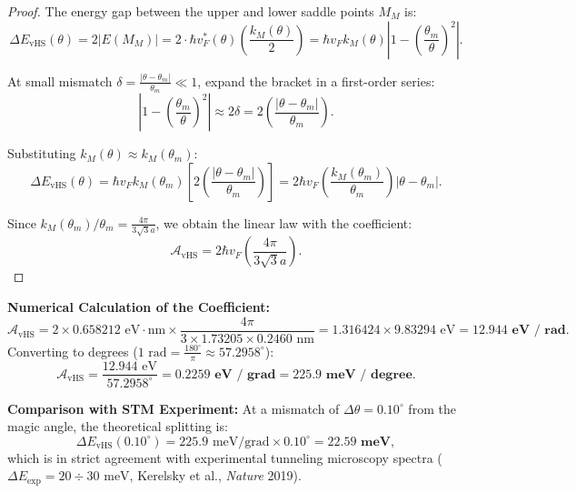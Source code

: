\documentclass[12pt,a4paper]{article}
\begin{document}
	\begin{proof}
	The energy gap between the upper and lower saddle points $M_M$ is:
	\begin{equation}
	\Delta E_{\text{vHS}}(\theta) = 2 |E(M_M)| = 2 \cdot \hbar v_F^*(\theta) \left( \frac{k_M(\theta)}{2} \right) = \hbar v_F k_M(\theta) \left| 1 - \left(\frac{\theta_m}{\theta}\right)^2 \right|.
	\end{equation}
				
	At small mismatch $\delta = \frac{|\theta - \theta_m|}{\theta_m} \ll 1$, expand the bracket in a first-order series:
\begin{equation}
\left| 1 - \left(\frac{\theta_m}{\theta}\right)^2 \right| \approx 2 \delta = 2 \left( \frac{|\theta - \theta_m|}{\theta_m} \right).
\end{equation}
				
Substituting $k_M(\theta) \approx k_M(\theta_m)$:
\begin{equation}
\Delta E_{\text{vHS}}(\theta) = \hbar v_F k_M(\theta_m) \left[ 2 \left( \frac{|\theta - \theta_m|}{\theta_m} \right) \right] = 2 \hbar v_F \left( \frac{k_M(\theta_m)}{\theta_m} \right) |\theta - \theta_m|.
\end{equation}
				
				Since $k_M(\theta_m) / \theta_m = \frac{4\pi}{3\sqrt{3} a}$, we obtain the linear law with the coefficient:
				\begin{equation}
					\mathcal{A}_{\text{vHS}} = 2 \hbar v_F \left( \frac{4\pi}{3\sqrt{3} a} \right).
				\end{equation}
			\end{proof}
			
			\textbf{Numerical Calculation of the Coefficient:}
			\begin{equation}
				\mathcal{A}_{\text{vHS}} = 2 \times 0.658212\text{ eV}\cdot\text{nm} \times \frac{4\pi}{3 \times 1.73205 \times 0.2460\text{ nm}} = 1.316424 \times 9.83294\text{ eV} = \mathbf{12.944\text{ eV / rad}}.
			\end{equation}
			Converting to degrees ($1\text{ rad} = \frac{180^\circ}{\pi} \approx 57.2958^\circ$):
			\begin{equation}
				\mathcal{A}_{\text{vHS}} = \frac{12.944\text{ eV}}{57.2958^\circ} = \mathbf{0.2259\text{ eV / grad}} = \mathbf{225.9\text{ meV / degree}}.
			\end{equation}
			
			\textbf{Comparison with STM Experiment:}
			At a mismatch of $\Delta \theta = 0.10^\circ$ from the magic angle, the theoretical splitting is:
			\begin{equation}
				\Delta E_{\text{vHS}}(0.10^\circ) = 225.9\text{ meV/grad} \times 0.10^\circ = \mathbf{22.59\text{ meV}},
			\end{equation}
			which is in strict agreement with experimental tunneling microscopy spectra ($\Delta E_{\text{exp}} = 20 \div 30\text{ meV}$, Kerelsky et al., \textit{Nature} 2019).
			
\end{document}
